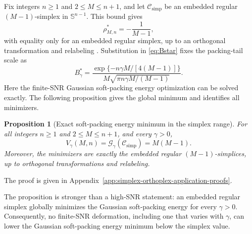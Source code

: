 \documentclass[12pt,draftclsnofoot,onecolumn]{IEEEtran}
\newcommand{\Sph}{\mathbb{S}}
\newcommand{\cC}{\mathcal{C}}
\newcommand{\cG}{\mathcal{G}}
\newtheorem{proposition}{Proposition}
\theoremstyle{definition}
\begin{document}
Fix integers \(n\ge1\) and \(2\leq M\leq n+1\), and let
\(\cC_{\mathrm{simp}}\) be an embedded regular \((M-1)\)-simplex in
\(\Sph^{n-1}\).  This bound gives
\begin{equation}
  \rho^{\ast}_{M,n}=-\frac1{M-1},
  \label{eq:simplex-packing-correlation}
\end{equation}
with equality only for an embedded regular simplex, up to an orthogonal
transformation and relabeling \cite{Rankin1955}.  Substitution in
\eqref{eq:Bstar} fixes the packing-tail scale as
\begin{equation}
  B_\gamma^{\ast}
  =\frac{\exp\{-n\gamma M/[4(M-1)]\}}
  {M\sqrt{\pi n\gamma M/(M-1)}}.
  \label{eq:simplex-packing-scale}
\end{equation}
Here the finite-SNR Gaussian soft-packing energy optimization can be solved exactly.  The
following proposition gives the global minimum and identifies all
minimizers.

\begin{proposition}[Exact soft-packing energy minimum in the simplex range]
\label{prop:simplex-energy-minimum}
For all integers \(n\geq1\) and \(2\leq M\leq n+1\), and every
\(\gamma>0\),
\begin{equation}
  V_\gamma(M,n)
  =\cG_\gamma(\cC_{\mathrm{simp}})
  =M(M-1).
  \label{eq:simplex-energy-minimum}
\end{equation}
Moreover, the minimizers are exactly the embedded regular
\((M-1)\)-simplices, up to orthogonal transformations and relabeling.
\end{proposition}
\begin{IEEEproof}
The proof is given in
Appendix~\ref{app:simplex-orthoplex-application-proofs}.
\end{IEEEproof}

The proposition
is stronger than a high-SNR statement: an embedded regular simplex
globally minimizes the Gaussian soft-packing energy for every \(\gamma>0\).    Consequently, no finite-SNR deformation,
including one that varies with \(\gamma\), can lower the Gaussian soft-packing energy
minimum below the simplex value.
\end{document}
